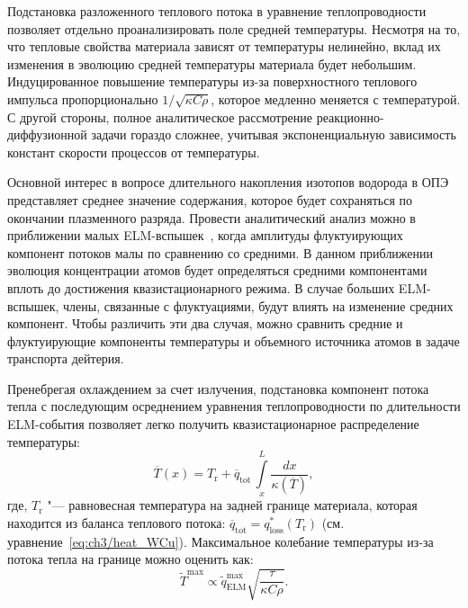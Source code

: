Подстановка разложенного теплового потока в уравнение теплопроводности позволяет отдельно проанализировать поле средней температуры. Несмотря на то, что тепловые свойства материала зависят от температуры нелинейно, вклад их изменения в эволюцию средней температуры материала будет небольшим. Индуцированное повышение температуры из-за поверхностного теплового импульса пропорционально $1/\sqrt{\kappa C \rho}$, которое медленно меняется с температурой. С другой стороны, полное аналитическое рассмотрение реакционно-диффузионной задачи гораздо сложнее, учитывая экспоненциальную зависимость констант скорости процессов от температуры.

Основной интерес в вопросе длительного накопления изотопов водорода в ОПЭ представляет среднее значение содержания, которое будет сохраняться по окончании плазменного разряда. Провести аналитический анализ можно в приближении малых ELM-вспышек~\cite{Marenkov2012a}, когда амплитуды флуктуирующих компонент потоков малы по сравнению со средними. В данном приближении эволюция концентрации атомов будет определяться средними компонентами вплоть до достижения квазистационарного режима. В случае больших ELM-вспышек, члены, связанные с флуктуациями, будут влиять на изменение средних компонент. Чтобы различить эти два случая, можно сравнить средние и флуктуирующие компоненты температуры и объемного источника атомов в задаче транспорта дейтерия.

Пренебрегая охлаждением за счет излучения, подстановка компонент потока тепла с последующим осреднением уравнения теплопроводности по длительности ELM-события позволяет легко получить квазистационарное распределение температуры:
\begin{equation}
	\label{eq:ch3/temp_av}
	\overline{T}(x)=T_\mathrm{r}+\overline{q}_{\mathrm{tot}}\,\int\limits_x^L\frac{dx}{\kappa(\overline{T})},
\end{equation}
где, $T_\mathrm{r}$ "--- равновесная температура на задней границе материала, которая находится из баланса теплового потока: $\overline{q}_{\mathrm{tot}}=q_{\mathrm{loss}}^*(T_\mathrm{r})$ (см. уравнение~\cref{eq:ch3/heat_WCu}). Максимальное колебание температуры из-за потока тепла на границе можно оценить как:
\begin{equation}
	\label{eq:ch3/temp_fluct}
	\widetilde{T}^{\max} \propto \widetilde{q}_{\mathrm{ELM}}^{\max} \sqrt{\frac{\tau}{\kappa C \rho}}.
\end{equation} 

